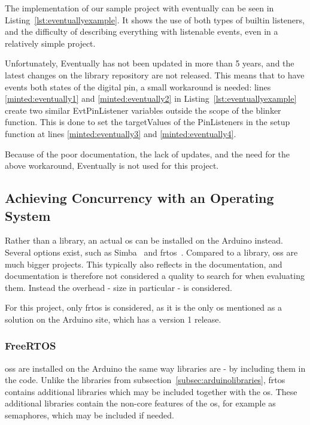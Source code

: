 The implementation of our sample project with eventually can be seen in Listing~\ref{lst:eventuallyexample}. It shows the use of both types of builtin listeners, and the difficulty of describing everything with listenable events, even in a relatively simple project.

Unfortunately, Eventually has not been updated in more than 5 years, and the latest changes on the library repository are not released. This means that to have events both states of the digital pin, a small workaround is needed: lines \ref{minted:eventually1} and \ref{minted:eventually2} in Listing~\ref{lst:eventuallyexample} create two similar EvtPinListener variables outside the scope of the blinker function. This is done to set the targetValues of the PinListeners in the setup function at lines \ref{minted:eventually3} and \ref{minted:eventually4}.

Because of the poor documentation, the lack of updates, and the need for the above workaround, Eventually is not used for this project.


\subsection{Achieving Concurrency with an Operating System}\label{subsec:arduinoos}
Rather than a library, an actual \gls{os} can be installed on the Arduino instead. Several options exist, such as Simba~\cite{SimbaOS} and \gls{frtos}~\cite{AboutRTOS}. Compared to a library, \glspl{os} are much bigger projects. This typically also reflects in the documentation, and documentation is therefore not considered a quality to search for when evaluating them. Instead the overhead - size in particular - is considered.

For this project, only \gls{frtos} is considered, as it is the only \gls{os} mentioned as a solution on the Arduino site, which has a version 1 release.


\subsubsection{FreeRTOS}
\glspl{os} are installed on the Arduino the same way libraries are - by including them in the code. Unlike the libraries from subsection~\ref{subsec:arduinolibraries}, \gls{frtos} contains additional libraries which may be included together with the \gls{os}. These additional libraries contain the non-core features of the \gls{os}, for example as semaphores, which may be included if needed.


